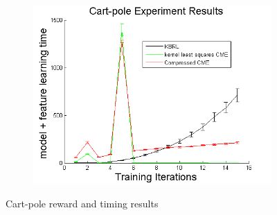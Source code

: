 \documentclass[letterpaper]{article}
\begin{document}
\begin{figure}[htb]
\begin{subfigure}[b]{0.3\textwidth}
\includegraphics[clip, width=\textwidth]{CPmodelfeature.png}
\end{subfigure}
\caption{Cart-pole reward and timing results}
  \label{CPfigs}
\end{figure}
\end{document}
